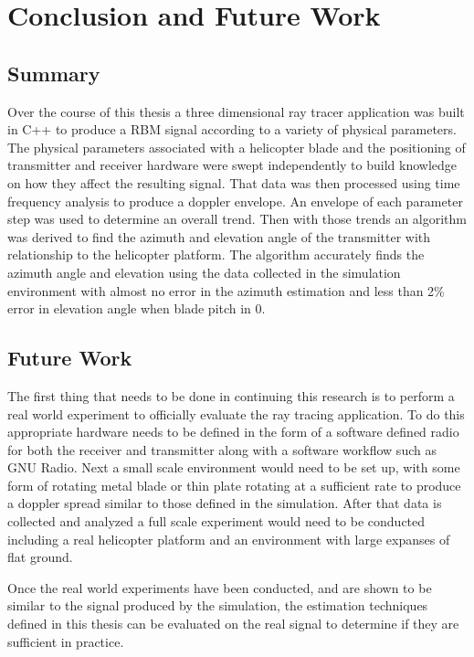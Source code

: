 \chapter{Conclusion and Future Work} \label{ch:conclusion}

\section{Summary}

Over the course of this thesis a three dimensional ray tracer application was built in C++ to produce a RBM signal according to a variety of physical parameters. The physical parameters associated with a helicopter blade and the positioning of transmitter and receiver hardware were swept independently to build knowledge on how they affect the resulting signal. That data was then processed using time frequency analysis to produce a doppler envelope. An envelope of each parameter step was used to determine an overall trend. Then with those trends an algorithm was derived to find the azimuth and elevation angle of the transmitter with relationship to the helicopter platform. The algorithm accurately finds the azimuth angle and elevation using the data collected in the simulation environment with almost no error in the azimuth estimation and less than 2\% error in elevation angle when blade pitch in 0\textdegree.

\section{Future Work}
The first thing that needs to be done in continuing this research is to perform a real world experiment to officially evaluate the ray tracing application. To do this appropriate hardware needs to be defined in the form of a software defined radio for both the receiver and transmitter along with a software workflow such as GNU Radio. Next a small scale environment would need to be set up, with some form of rotating metal blade or thin plate rotating at a sufficient rate to produce a doppler spread similar to those defined in the simulation. After that data is collected and analyzed a full scale experiment would need to be conducted including a real helicopter platform and an environment with large expanses of flat ground.

Once the real world experiments have been conducted, and are shown to be similar to the signal produced by the simulation, the estimation techniques defined in this thesis can be evaluated on the real signal to determine if they are sufficient in practice.

